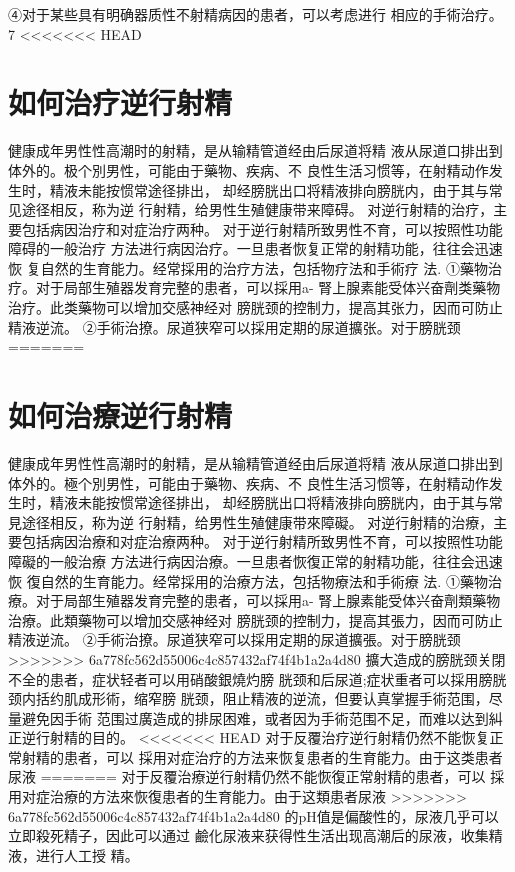 \documentclass[12pt,UTF8]{ctexbook}
\begin{document}
④对于某些具有明确器质性不射精病因的患者，可以考虑进行
相应的手術治疗。
7
<<<<<<< HEAD
\section{如何治疗逆行射精}
健康成年男性性高潮时的射精，是从输精管道经由后尿道将精
液从尿道口排出到体外的。极个別男性，可能由于藥物、疾病、不
良性生活习惯等，在射精动作发生时，精液未能按惯常途径排出，
却经膀胱出口将精液排向膀胱内，由于其与常见途径相反，称为逆
行射精，给男性生殖健康带来障碍。
对逆行射精的治疗，主要包括病因治疗和对症治疗两种。
对于逆行射精所致男性不育，可以按照性功能障碍的一般治疗
方法进行病因治疗。一旦患者恢复正常的射精功能，往往会迅速恢
复自然的生育能力。经常採用的治疗方法，包括物疗法和手術疗
法.
①藥物治疗。对于局部生殖器发育完整的患者，可以採用a-
腎上腺素能受体兴奋劑类藥物治疗。此类藥物可以增加交感神经对
膀胱颈的控制力，提高其张力，因而可防止精液逆流。
②手術治撩。尿道狭窄可以採用定期的尿道擴张。对于膀胱颈
=======
\section{如何治療逆行射精}
健康成年男性性高潮时的射精，是从输精管道经由后尿道将精
液从尿道口排出到体外的。極个別男性，可能由于藥物、疾病、不
良性生活习惯等，在射精动作发生时，精液未能按惯常途径排出，
却经膀胱出口将精液排向膀胱内，由于其与常見途径相反，称为逆
行射精，给男性生殖健康带來障礙。
对逆行射精的治療，主要包括病因治療和对症治療两种。
对于逆行射精所致男性不育，可以按照性功能障礙的一般治療
方法进行病因治療。一旦患者恢復正常的射精功能，往往会迅速恢
復自然的生育能力。经常採用的治療方法，包括物療法和手術療
法.
①藥物治療。对于局部生殖器发育完整的患者，可以採用a-
腎上腺素能受体兴奋劑類藥物治療。此類藥物可以增加交感神经对
膀胱颈的控制力，提高其張力，因而可防止精液逆流。
②手術治撩。尿道狭窄可以採用定期的尿道擴張。对于膀胱颈
>>>>>>> 6a778fc562d55006c4c857432af74f4b1a2a4d80
擴大造成的膀胱颈关閉不全的患者，症状轻者可以用硝酸銀燒灼膀
胱颈和后尿道;症状重者可以採用膀胱颈内括约肌成形術，缩窄膀
胱颈，阻止精液的逆流，但要认真掌握手術范围，尽量避免因手術
范围过廣造成的排尿困难，或者因为手術范围不足，而难以达到糾
正逆行射精的目的。
<<<<<<< HEAD
对于反覆治疗逆行射精仍然不能恢复正常射精的患者，可以
採用对症治疗的方法来恢复患者的生育能力。由于这类患者尿液
=======
对于反覆治療逆行射精仍然不能恢復正常射精的患者，可以
採用对症治療的方法來恢復患者的生育能力。由于这類患者尿液
>>>>>>> 6a778fc562d55006c4c857432af74f4b1a2a4d80
的pH值是偏酸性的，尿液几乎可以立即殺死精子，因此可以通过
鹼化尿液来获得性生活出现高潮后的尿液，收集精液，进行人工授
精。
\end{document}
